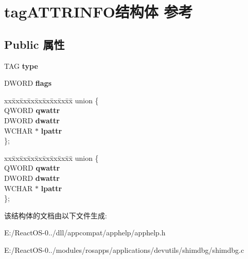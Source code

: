 \hypertarget{structtag_a_t_t_r_i_n_f_o}{}\section{tag\+A\+T\+T\+R\+I\+N\+F\+O结构体 参考}
\label{structtag_a_t_t_r_i_n_f_o}
\subsection*{Public 属性}
\begin{DoxyCompactItemize}
\item 
\mbox{\label{structtag_a_t_t_r_i_n_f_o_aea714b63df306d36472aca67a11bba42}} 
T\+AG {\bfseries type}
\item 
\mbox{\label{structtag_a_t_t_r_i_n_f_o_acb16ffeca307eb43eee0479902b2da8b}} 
D\+W\+O\+RD {\bfseries flags}
\item 
\mbox{\label{structtag_a_t_t_r_i_n_f_o_ae9f0717ef760818c27ccf2faca02b714}} 
\begin{tabbing}
xx\=xx\=xx\=xx\=xx\=xx\=xx\=xx\=xx\=\kill
union \{\\
\>QWORD {\bfseries qwattr}\\
\>DWORD {\bfseries dwattr}\\
\>WCHAR $\ast$ {\bfseries lpattr}\\
\}; \\

\end{tabbing}\item 
\mbox{\label{structtag_a_t_t_r_i_n_f_o_a1be1b3600bf7f36895c9861b7de4d20e}} 
\begin{tabbing}
xx\=xx\=xx\=xx\=xx\=xx\=xx\=xx\=xx\=\kill
union \{\\
\>QWORD {\bfseries qwattr}\\
\>DWORD {\bfseries dwattr}\\
\>WCHAR $\ast$ {\bfseries lpattr}\\
\}; \\

\end{tabbing}\end{DoxyCompactItemize}


该结构体的文档由以下文件生成\+:\begin{DoxyCompactItemize}
\item 
E\+:/\+React\+O\+S-\/0../dll/appcompat/apphelp/apphelp.\+h\item 
E\+:/\+React\+O\+S-\/0../modules/rosapps/applications/devutils/shimdbg/shimdbg.\+c\end{DoxyCompactItemize}
